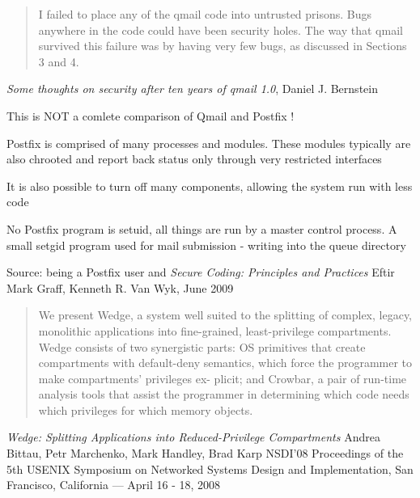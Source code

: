 \documentclass[Screen16to9,17pt]{foils}
\begin{document}

\begin{quote}
I failed to place any of the qmail code into untrusted prisons. Bugs anywhere in the code could have been security holes. The way that qmail survived this failure was by having very few bugs, as discussed in Sections 3 and 4.
\end{quote}
\emph{Some thoughts on security after ten years of qmail 1.0},
Daniel J. Bernstein

\begin{list2}
\item This is NOT a comlete comparison of Qmail and Postfix !
\item Postfix is comprised of many processes and modules. These modules typically are also chrooted and report back status only through very restricted interfaces
\item It is also possible to turn off many components, allowing the system run with less code
\item No Postfix program is setuid, all things are run by a master control process. A small setgid program used for mail submission - writing into the queue directory
\end{list2}

Source: being a Postfix user and \emph{Secure Coding: Principles and Practices}
Eftir Mark Graff, Kenneth R. Van Wyk, June 2009



\begin{quote}
We present Wedge, a system well suited to the
splitting of complex, legacy, monolithic applications into
fine-grained, least-privilege compartments. Wedge consists of two synergistic parts: OS primitives that create
compartments with default-deny semantics, which force
the programmer to make compartments’ privileges ex-
plicit; and Crowbar, a pair of run-time analysis tools
that assist the programmer in determining which code
needs which privileges for which memory objects.
\end{quote}

\emph{Wedge: Splitting Applications into Reduced-Privilege Compartments}
Andrea Bittau, Petr Marchenko, Mark Handley, Brad Karp
NSDI'08 Proceedings of the 5th USENIX Symposium on Networked Systems Design and Implementation, San Francisco, California — April 16 - 18, 2008

\end{document}
